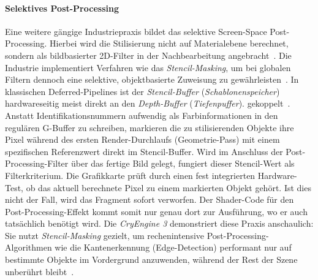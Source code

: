 \paragraph{Selektives Post-Processing}
Eine weitere gängige Industriepraxis bildet das selektive Screen-Space Post-Processing.
Hierbei wird die Stilisierung nicht auf Materialebene berechnet, sondern als bildbasierter 2D-Filter
in der Nachbearbeitung angebracht~\parencite[vgl.][S.~661]{akenine-mollerRealtimeRendering2019}.
Die Industrie implementiert Verfahren wie das \textit{Stencil-Masking}, um bei globalen Filtern dennoch eine selektive,
objektbasierte Zuweisung zu gewährleisten~\parencite[vgl.][S.~81]{AdvancesRealTimeRendering}.
In klassischen Deferred-Pipelines ist der \textit{Stencil-Buffer} (\textit{Schablonenspeicher}) hardwareseitig meist
direkt an den \textit{Depth-Buffer} (\textit{Tiefenpuffer}).
gekoppelt~\parencite[vgl.][Folie~\enquote{\ac{G-Buffer}: Our approach}]{valientDeferredRenderingKillzone}.
Anstatt Identifikationsnummern aufwendig als Farbinformationen in den regulären \ac{G-Buffer} zu schreiben, markieren die zu
stilisierenden Objekte ihre Pixel während des ersten Render-Durchlaufs (Geometrie-Pass) mit einem spezifischen
Referenzwert direkt im Stencil-Buffer.
Wird im Anschluss der Post-Processing-Filter über das fertige Bild gelegt, fungiert dieser Stencil-Wert als
Filterkriterium.
Die Grafikkarte prüft durch einen fest integrierten Hardware-Test, ob das aktuell berechnete Pixel zu einem markierten
Objekt gehört.
Ist dies nicht der Fall, wird das Fragment sofort verworfen.
Der Shader-Code für den Post-Processing-Effekt kommt somit nur genau dort zur Ausführung, wo er auch tatsächlich
benötigt wird.
Die \textit{CryEngine 3} demonstriert diese Praxis anschaulich: Sie nutzt \textit{Stencil-Masking} gezielt, um
rechenintensive Post-Processing-Algorithmen wie die Kantenerkennung (Edge-Detection) performant nur auf bestimmte
Objekte im Vordergrund anzuwenden, während der Rest der Szene unberührt
bleibt~\parencite[vgl.][S.~81]{AdvancesRealTimeRendering}.

